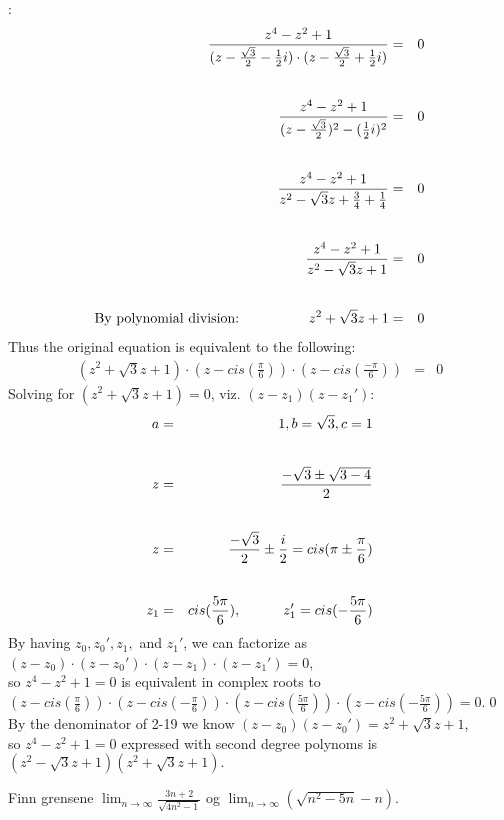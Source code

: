 \documentclass{myassignment}
\begin{document}
\begin{answer}
		:
		\begin{eqnarray}
			\frac{z^4 - z^2 + 1}{(z - \frac{\sqrt{3}}{2} - \frac {1}{2}i)\cdot(z - \frac{\sqrt{3}}{2} + \frac {1}{2}i)} &=& 0 \\[2em]
			\frac{z^4 - z^2 + 1}{(z - \frac{\sqrt{3}}{2})^2 - (\frac {1}{2}i)^2} &=& 0 \\[2em]
			\frac{z^4 - z^2 + 1}{z^2 - \sqrt{3}z + \frac{3}{4} + \frac {1}{4}} &=& 0 \\[2em]
			\frac{z^4 - z^2 + 1}{z^2 - \sqrt{3}z + 1} &=& 0\\[2em]
		\text{By polynomial division:}\hspace*{5em} 
		z^2+\sqrt{3}z+1 &=& 0
		\end{eqnarray}
		Thus the original equation is equivalent to the following:
		\begin{eqnarray}
			(z^2+\sqrt{3}z+1)\cdot(z-cis(\frac{\pi}{6}))\cdot(z-cis(\frac{-\pi}{6})) &=&0
		\end{eqnarray}
		Solving for $(z^2+\sqrt{3}z+1)=0$, viz. $(z-z_1)(z-z_1')$:
		\begin{eqnarray}
			a &=& 1, b = \sqrt{3}, c = 1 \\[2em]
			z &=& \frac{-\sqrt{3}\pm\sqrt{3-4}}{2} \\[2em]
			z &=& \frac{-\sqrt{3}}{2}\pm\frac{i}{2} = cis(\pi\pm \frac{\pi}{6}) \\[2em]
			z_1 &=& cis(\frac{5\pi}{6}), \hspace*{3em} z_1' = cis(-\frac{5\pi}{6})
		\end{eqnarray}
		\blackqed
		By having $z_0, z_0', z_1,$ and $z_1'$, we can factorize as $(z-z_0)\cdot(z-z_0')\cdot(z-z_1)\cdot(z-z_1')=0$, \\[1em]
		so $z^4 - z^2 + 1=0$ is equivalent in complex roots to\\[1em]
		$(z-cis(\frac{\pi}{6}))\cdot(z-cis(-\frac{\pi}{6}))\cdot(z-cis(\frac{5\pi}{6}))\cdot(z-cis(-\frac{5\pi}{6}))=0$.\qed \\[1em]
		By the denominator of 2-19 we know $(z-z_0)(z-z_0')=z^2+\sqrt{3}z+1$, \\[1em]
		so $z^4 - z^2 + 1=0$ expressed with second degree polynoms is $(z^2 - \sqrt{3}z + 1)(z^2+\sqrt{3}z+1).$

	\end{answer}


	\pagebreak
	\begin{problem}
		Finn grensene $\lim_{n \rightarrow \infty}\frac{3n + 2}{\sqrt{4n^2 - 1}}$ og $\lim_{n\rightarrow\infty}(\sqrt{n^2 - 5n} - n)$.
	\end{problem}
\end{document}
